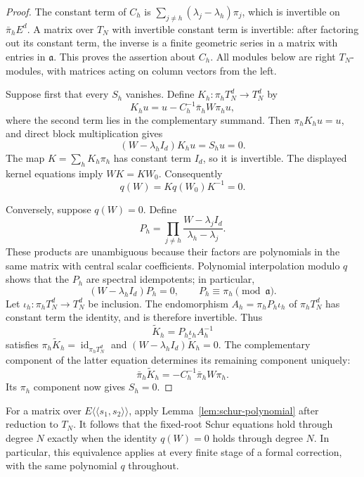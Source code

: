 \begin{proof}
The constant term of $C_h$ is
$\sum_{j\ne h}(\lambda_j-\lambda_h)\pi_j$, which is invertible on
$\bar\pi_h E^d$. A matrix over $T_N$ with invertible constant term is
invertible: after factoring out its constant term, the inverse is a
finite geometric series in a matrix with entries in $\mathfrak a$.
This proves the assertion about $C_h$. All modules below are right
$T_N$-modules, with matrices acting on column vectors from the left.

Suppose first that every $S_h$ vanishes. Define
$K_h:\pi_hT_N^d\longrightarrow T_N^d$ by
\[
  K_hu=u-C_h^{-1}\bar\pi_hW\pi_hu,
\]
where the second term lies in the complementary summand. Then
$\pi_hK_hu=u$, and direct block multiplication gives
\[
  (W-\lambda_h I_d)K_hu=S_hu=0.
\]
The map $K=\sum_hK_h\pi_h$ has constant term $I_d$, so it is
invertible. The displayed kernel equations imply
$WK=KW_0$. Consequently
\[
  q(W)=Kq(W_0)K^{-1}=0.
\]

Conversely, suppose $q(W)=0$. Define
\[
  P_h=\prod_{j\ne h}
       \frac{W-\lambda_j I_d}{\lambda_h-\lambda_j}.
\]
These products are unambiguous because their factors are polynomials
in the same matrix with central scalar coefficients. Polynomial
interpolation modulo $q$ shows that the $P_h$ are spectral
idempotents; in particular,
\[
  (W-\lambda_h I_d)P_h=0,
  \qquad P_h\equiv\pi_h\pmod{\mathfrak a}.
\]
Let $\iota_h:\pi_hT_N^d\longrightarrow T_N^d$ be inclusion. The
endomorphism $A_h=\pi_hP_h\iota_h$ of $\pi_hT_N^d$ has constant
term the identity, and is therefore invertible. Thus
\[
  \widetilde K_h=P_h\iota_hA_h^{-1}
\]
satisfies
$\pi_h\widetilde K_h=\operatorname{id}_{\pi_hT_N^d}$ and
$(W-\lambda_h I_d)\widetilde K_h=0$. The complementary component
of the latter equation determines its remaining component uniquely:
\[
  \bar\pi_h\widetilde K_h
    =-C_h^{-1}\bar\pi_hW\pi_h.
\]
Its $\pi_h$ component now gives $S_h=0$.
\end{proof}

For a matrix over $E\langle\!\langle s_1,s_2\rangle\!\rangle$,
apply Lemma~\ref{lem:schur-polynomial} after reduction to $T_N$.
It follows that the fixed-root Schur equations hold through degree
$N$ exactly when the identity $q(W)=0$ holds through degree $N$.
In particular, this equivalence applies at every finite stage of a
formal correction, with the same polynomial $q$ throughout.
